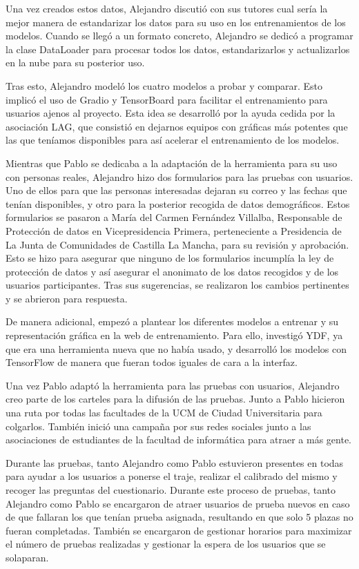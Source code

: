 Una vez creados estos datos, Alejandro discutió con sus tutores cual sería la mejor manera de estandarizar los datos para su uso en los entrenamientos de los modelos. Cuando se llegó a un formato concreto, Alejandro se dedicó a programar la clase DataLoader para procesar todos los datos, estandarizarlos y actualizarlos en la nube para su posterior uso.

Tras esto, Alejandro modeló los cuatro modelos a probar y comparar. Esto implicó el uso de Gradio y TensorBoard para facilitar el entrenamiento para usuarios ajenos al proyecto. Esta idea se desarrolló por la ayuda cedida por la asociación LAG, que consistió en dejarnos equipos con gráficas más potentes que las que teníamos disponibles para así acelerar el entrenamiento de los modelos.

Mientras que Pablo se dedicaba a la adaptación de la herramienta para su uso con personas reales, Alejandro hizo dos formularios para las pruebas con usuarios. Uno de ellos para que las personas interesadas dejaran su correo y las fechas que tenían disponibles, y otro para la posterior recogida de datos demográficos. Estos formularios se pasaron a María del Carmen Fernández Villalba, Responsable de Protección de datos en Vicepresidencia Primera, perteneciente a Presidencia de La Junta de Comunidades de Castilla La Mancha, para su revisión y aprobación.
Esto se hizo para asegurar que ninguno de los formularios incumplía la ley de protección de datos y así asegurar el anonimato de los datos recogidos y de los usuarios participantes. Tras sus sugerencias, se realizaron los cambios pertinentes y se abrieron para respuesta.

De manera adicional, empezó a plantear los diferentes modelos a entrenar y su representación gráfica en la web de entrenamiento. Para ello, investigó YDF, ya que era una herramienta nueva que no había usado, y desarrolló los modelos con TensorFlow de manera que fueran todos iguales de cara a la interfaz.

Una vez Pablo adaptó la herramienta para las pruebas con usuarios, Alejandro creo parte de los carteles para la difusión de las pruebas. Junto a Pablo hicieron una ruta por todas las facultades de la UCM de Ciudad Universitaria para colgarlos. También inició una campaña por sus redes sociales junto a las asociaciones de estudiantes de la facultad de informática para atraer a más gente.

Durante las pruebas, tanto Alejandro como Pablo estuvieron presentes en todas para ayudar a los usuarios a ponerse el traje, realizar el calibrado del mismo y recoger las preguntas del cuestionario. Durante este proceso de pruebas, tanto Alejandro como Pablo se encargaron de atraer usuarios de prueba nuevos en caso de que fallaran los que tenían prueba asignada, resultando en que solo 5 plazas no fueran completadas.
También se encargaron de gestionar horarios para maximizar el número de pruebas realizadas y gestionar la espera de los usuarios que se solaparan.

